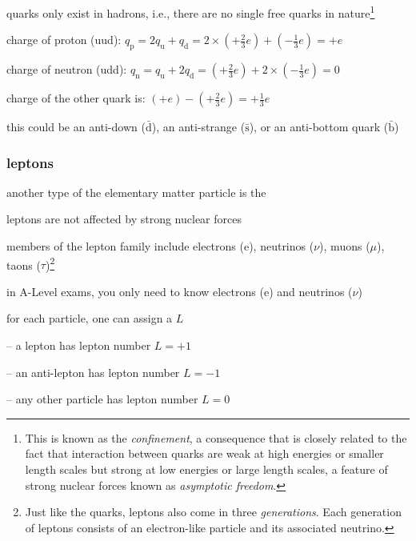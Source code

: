 \cmt quarks only exist in hadrons, i.e., there are no single free quarks in nature\footnote{This is known as the \emph{confinement}, a consequence that is closely related to the fact that interaction between quarks are weak at high energies or smaller length scales but strong at low energies or large length scales, a feature of strong nuclear forces known as \emph{asymptotic freedom}.}



\sol charge of proton (uud): $q_\text{p} = 2q_\text{u} + q_\text{d} = 2\times\left(+\frac{2}{3}e\right) + \left(-\frac{1}{3}e\right) = +e$

\eqyskip charge of neutron (udd): $q_\text{n} = q_\text{u} + 2q_\text{d} = \left(+\frac{2}{3}e\right) + 2\times\left(-\frac{1}{3}e\right) = 0$ \eoe


\sol charge of the other quark is: $(+e) - \left(+\frac{2}{3}e\right) = +\frac{1}{3}e$

this could be an anti-down ($\bar{\text{d}}$), an anti-strange ($\bar{\text{s}}$), or an anti-bottom quark ($\bar{\text{b}}$)\eoe



\subsubsection{leptons}

another type of the elementary matter particle is the 

\cmt leptons are not affected by strong nuclear forces

\cmt members of the lepton family include electrons (e), neutrinos ($\nu$), muons ($\mu$), taons ($\tau$)\footnote{Just like the quarks, leptons also come in three \emph{generations}. Each generation of leptons consists of an electron-like particle and its associated neutrino.}

in A-Level exams, you only need to know electrons (e) and neutrinos ($\nu$)


\cmt for each particle, one can assign a  $L$

\begin{compactitem}
	\item[--] a lepton has lepton number $L=+1$
	
	\item[--] an anti-lepton has lepton number $L=-1$
	
	 \item[--]any other particle has lepton number $L=0$
\end{compactitem}

